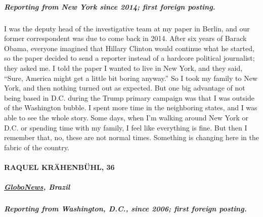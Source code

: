 \hypertarget{reporting-from-new-york-since-2014-first-foreign-posting-1}{%
\subparagraph{\texorpdfstring{\textbf{Reporting from New York since
2014; first foreign
posting.}}{Reporting from New York since 2014; first foreign posting.}}\label{reporting-from-new-york-since-2014-first-foreign-posting-1}}

I was the deputy head of the investigative team at my paper in Berlin,
and our former correspondent was due to come back in 2014. After six
years of Barack Obama, everyone imagined that Hillary Clinton would
continue what he started, so the paper decided to send a reporter
instead of a hardcore political journalist; they asked me. I told the
paper I wanted to live in New York, and they said, ``Sure, America might
get a little bit boring anyway.'' So I took my family to New York, and
then nothing turned out as expected. But one big advantage of not being
based in D.C. during the Trump primary campaign was that I was outside
of the Washington bubble. I spent more time in the neighboring states,
and I was able to see the whole story. Some days, when I'm walking
around New York or D.C. or spending time with my family, I feel like
everything is fine. But then I remember that, no, these are not normal
times. Something is changing here in the fabric of the country.

\hypertarget{raquel-kruxe4henbuxfchl-36}{%
\paragraph{RAQUEL KRÄHENBÜHL, 36}\label{raquel-kruxe4henbuxfchl-36}}

\hypertarget{globonews-brazil}{%
\subparagraph{\texorpdfstring{\textbf{\href{https://g1.globo.com/globonews/}{GloboNews},
Brazil}}{GloboNews, Brazil}}\label{globonews-brazil}}

\hypertarget{reporting-from-washington-dc-since-2006-first-foreign-posting}{%
\subparagraph{\texorpdfstring{\textbf{Reporting from Washington, D.C.,
since 2006; first foreign
posting.}}{Reporting from Washington, D.C., since 2006; first foreign posting.}}\label{reporting-from-washington-dc-since-2006-first-foreign-posting}}

